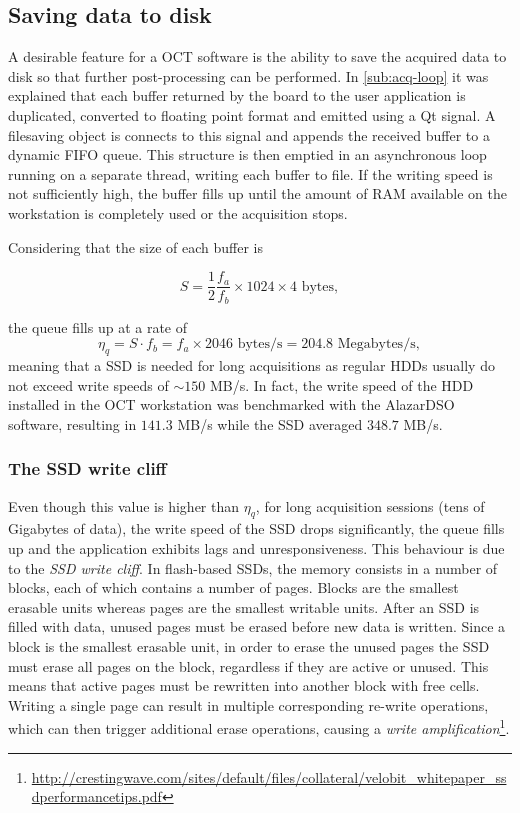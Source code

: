 \subsection{Saving data to disk}
A desirable feature for a OCT software is the ability to save the acquired data to disk so that further post-processing can be performed. In \autoref{sub:acq-loop} it was explained that each buffer returned by the board to the user application is duplicated, converted to floating point format and emitted using a Qt signal. A filesaving object is connects to this signal and appends the received buffer to a dynamic FIFO queue. This structure is then emptied in an asynchronous loop running on a separate thread, writing each buffer to file. If the writing speed is not sufficiently high, the buffer fills up until the amount of RAM available on the workstation is completely used or the acquisition stops. 

Considering that the size of each buffer is

\begin{equation}
	S = \frac{1}{2} \frac{f_a}{f_b} \times 1024 \times 4 \text{ bytes},
\end{equation}

the queue fills up at a rate of
\begin{equation}
\eta_{q} = S \cdot f_b = f_a \times 2046\text{ bytes/s} = 204.8\text{ Megabytes/s},
\end{equation}
meaning that a \ac{SSD} is needed for long acquisitions as regular \acp{HDD} usually do not exceed write speeds of $\sim 150$ MB/s. In fact, the write speed of the HDD installed in the OCT workstation was benchmarked with the AlazarDSO software, resulting in $141.3$ MB/s while the SSD averaged $348.7$ MB/s. 

\subsubsection{The SSD write cliff}
Even though this value is higher than $\eta_q$, for long acquisition sessions (tens of Gigabytes of data), the write speed of the SSD drops significantly, the queue fills up and the application exhibits lags and unresponsiveness. This behaviour is due to the \emph{SSD write cliff}. In flash-based SSDs, the memory consists in a number of blocks, each of which contains a number of pages. Blocks are the smallest erasable units whereas pages are the smallest writable units. After an SSD is filled with data, unused pages must be erased before new data is written. Since a block is the smallest erasable unit, in order to erase the unused pages the SSD must erase all pages on the block, regardless if they are active or unused. This means that active pages must be rewritten into another block with free cells. Writing a single page can result in multiple corresponding re-write operations, which can then trigger additional erase operations, causing a \emph{write amplification}\footnote{\url{http://crestingwave.com/sites/default/files/collateral/velobit_whitepaper_ssdperformancetips.pdf}}. 

